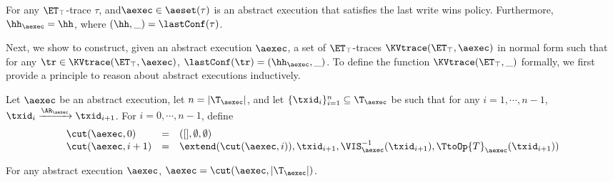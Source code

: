 \begin{proposition}
\label{prop:kvtrace2aexec}
For any $\ET_{\top}$-trace $\tau$, and$\aexec \in \aeset(\tau)$ is an abstract execution that 
satisfies the last write wins policy. Furthermore, $\hh_{\aexec} = \hh$, where 
$(\hh, \_) = \lastConf(\tau)$.
\end{proposition}

Next, we show to construct, given an abstract execution $\aexec$, 
a set of $\ET_{\top}$-traces $\KVtrace(\ET_{\top}, \aexec)$ in normal form such that for any 
$\tr \in \KVtrace(\ET_{\top}, \aexec)$, $\lastConf(\tr) = (\hh_{\aexec}, \_)$. 
To define the function $\KVtrace(\ET_{\top}, \_)$ formally, we first provide a principle 
to reason about abstract executions inductively. 
\begin{definition}
\label{def:aexec.inductive}
Let $\aexec$ be an abstract execution, let $n = \lvert \T_{\aexec} \rvert$, and let 
$\{\txid_{i}\}_{i=1}^{n} \subseteq \T_{\aexec}$ be such that for any $i=1,\cdots,n-1$, 
$\txid_{i} \xrightarrow{\AR_{\aexec}} \txid_{i+1}$. 
For $i = 0,\cdots, n-1$, define 
\[
\begin{array}{lll}
\cut(\aexec, 0) &=& ([], \emptyset, \emptyset)\\
\cut(\aexec , i+1) &=& \extend(\cut(\aexec, i)), \txid_{i+1}, \VIS^{-1}_{\aexec}(\txid_{i+1}), \TtoOp{T}_{\aexec}(\txid_{i+1}))
\end{array}
\]
\end{definition}

\begin{proposition}
\label{prop:aexec.inductive}
For any abstract execution $\aexec$, $\aexec = \cut(\aexec, \lvert \T_{\aexec} \rvert)$.
\end{proposition}

